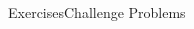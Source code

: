 \documentclass[9pt,aspectratio=169]{beamer}
\begin{document}
\begin{frame}{Exercises\hspace*{0.35\textwidth}Challenge Problems}
\begin{columns}[T]
\begin{column}{0.5\textwidth}
      \hspace{2.5em}{\footnotesize * very hard}
    \end{column}
  \end{columns}
\end{frame}

\end{document}
